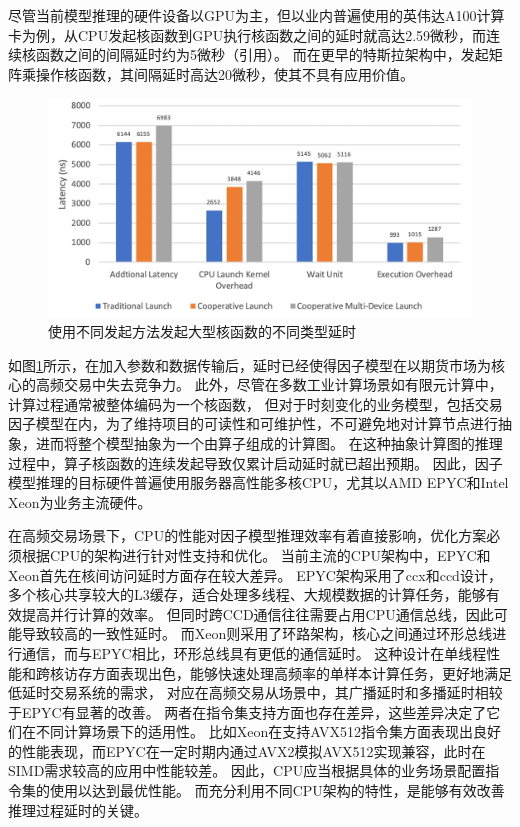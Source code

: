 尽管当前模型推理的硬件设备以GPU为主，但以业内普遍使用的英伟达A100计算卡为例，从CPU发起核函数到GPU执行核函数之间的延时就高达2.59微秒，而连续核函数之间的间隔延时约为5微秒（引用）。
而在更早的特斯拉架构中，发起矩阵乘操作核函数，其间隔延时高达20微秒，使其不具有应用价值。
\begin{figure}[h]
    \centering
    \includegraphics[width=1\textwidth]{image/chap02/Overhead.png}
    \caption{使用不同发起方法发起大型核函数的不同类型延时}
    \label{fig:kernel}
\end{figure}
如图\ref{fig:kernel}所示，在加入参数和数据传输后，延时已经使得因子模型在以期货市场为核心的高频交易中失去竞争力。
此外，尽管在多数工业计算场景如有限元计算中，计算过程通常被整体编码为一个核函数，
但对于时刻变化的业务模型，包括交易因子模型在内，为了维持项目的可读性和可维护性，不可避免地对计算节点进行抽象，进而将整个模型抽象为一个由算子组成的计算图。
在这种抽象计算图的推理过程中，算子核函数的连续发起导致仅累计启动延时就已超出预期。
因此，因子模型推理的目标硬件普遍使用服务器高性能多核CPU，尤其以AMD EPYC和Intel Xeon为业务主流硬件。

在高频交易场景下，CPU的性能对因子模型推理效率有着直接影响，优化方案必须根据CPU的架构进行针对性支持和优化。
当前主流的CPU架构中，EPYC和Xeon首先在核间访问延时方面存在较大差异。
EPYC架构采用了ccx和ccd设计，多个核心共享较大的L3缓存，适合处理多线程、大规模数据的计算任务，能够有效提高并行计算的效率。
但同时跨CCD通信往往需要占用CPU通信总线，因此可能导致较高的一致性延时。
而Xeon则采用了环路架构，核心之间通过环形总线进行通信，而与EPYC相比，环形总线具有更低的通信延时。
这种设计在单线程性能和跨核访存方面表现出色，能够快速处理高频率的单样本计算任务，更好地满足低延时交易系统的需求，
对应在高频交易从场景中，其广播延时和多播延时相较于EPYC有显著的改善。
两者在指令集支持方面也存在差异，这些差异决定了它们在不同计算场景下的适用性。
比如Xeon在支持AVX512指令集方面表现出良好的性能表现，而EPYC在一定时期内通过AVX2模拟AVX512实现兼容，此时在SIMD需求较高的应用中性能较差。
因此，CPU应当根据具体的业务场景配置指令集的使用以达到最优性能。
而充分利用不同CPU架构的特性，是能够有效改善推理过程延时的关键。

